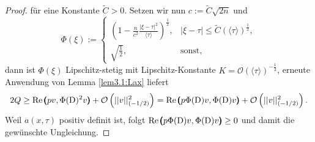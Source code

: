 \begin{proof}
für eine Konstante $\tilde{C}>0$. Setzen wir nun $c:=\tilde{C}\sqrt{2n}$ und 
\begin{equation}
	\Phi(\xi):=\begin{cases}
		\left(1-\frac{n}{c^2}\frac{| \xi-\tau|^2}{\langle\tau\rangle}\right)^{\frac{1}{2}}, &| \xi-\tau| \le \tilde C(\langle\tau\rangle)^{\frac{1}{2}},\\
		\sqrt{\frac{1}{2}}, & \text{sonst},
	\end{cases}
\end{equation}
dann ist $\Phi(\xi)$ Lipschitz-stetig mit Lipschitz-Konstante $K=\mathcal O(\langle\tau\rangle)^{-\frac{1}{2}}$, erneute Anwendung von Lemma \ref{lem3.1:Lax} liefert
\begin{equation}
	2Q \ge \operatorname{Re}\pmb(pv,\Phi(\mathrm D)^2v\pmb)+\mathcal{O}\left(|| v||_{\left(-{1}/{2}\right)}^2\right) = \operatorname{Re}\pmb(p\Phi(\mathrm D)v,\Phi(\mathrm D)v\pmb)+\mathcal{O}\left(|| v||_{\left(-{1}/{2}\right)}^2\right).
\end{equation}
Weil $a(x,\tau)$ positiv definit ist, folgt $\operatorname{Re}\pmb(p\Phi(\mathrm D)v,\Phi(\mathrm D)v\pmb)\ge 0$ und damit die gewünschte Ungleichung. 
\end{proof}

